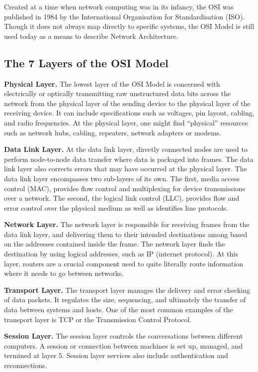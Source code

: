 \documentclass[../report.tex]{subfiles}
\begin{document}
Created at a time when network computing was in its infancy, the OSI was published in 1984 by the International Organisation for Standardisation (ISO). Though it does not always map directly to specific systems, the OSI Model is still used today as a means to describe Network Architecture.

\subsection{The 7 Layers of the OSI Model}

\textbf{Physical Layer.} The lowest layer of the OSI Model is concerned with electrically or optically transmitting raw unstructured data bits across the network from the physical layer of the sending device to the physical layer of the receiving device. It can include specifications such as voltages, pin layout, cabling, and radio frequencies. At the physical layer, one might find “physical” resources such as network hubs, cabling, repeaters, network adapters or modems.

\textbf{Data Link Layer.} At the data link layer, directly connected nodes are used to perform node-to-node data transfer where data is packaged into frames. The data link layer also corrects errors that may have occurred at the physical layer. The data link layer encompasses two sub-layers of its own. The first, media access control (MAC), provides flow control and multiplexing for device transmissions over a network. The second, the logical link control (LLC), provides flow and error control over the physical medium as well as identifies line protocols.

\textbf{Network Layer.} The network layer is responsible for receiving frames from the data link layer, and delivering them to their intended destinations among based on the addresses contained inside the frame. The network layer finds the destination by using logical addresses, such as IP (internet protocol). At this layer, routers are a crucial component used to quite literally route information where it needs to go between networks.

\textbf{Transport Layer.} The transport layer manages the delivery and error checking of data packets. It regulates the size, sequencing, and ultimately the transfer of data between systems and hosts. One of the most common examples of the transport layer is TCP or the Transmission Control Protocol.

\textbf{Session Layer.} The session layer controls the conversations between different computers. A session or connection between machines is set up, managed, and termined at layer 5. Session layer services also include authentication and reconnections.
\end{document}
